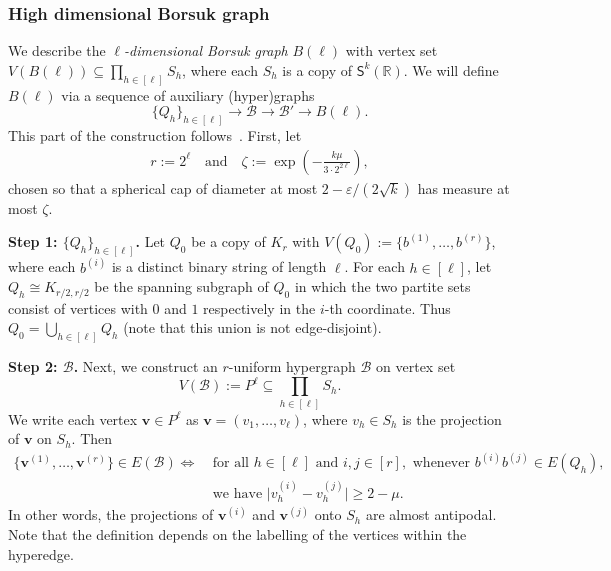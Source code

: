 \documentclass[11pt, a4paper]{article}
\newcommand{\V}[1]{\mathbold{#1}}
\theoremstyle{definition}
\def\eps{{\varepsilon}}
\newcommand{\cB}{\mathcal{B}}
\newcommand{\sS}{\mathsf{S}}
\newcommand{\sR}{\mathbb{R}}
\newcommand*{\bigabs}[1]{\bigl|#1\bigr|}
\begin{document}
\subsubsection{High dimensional Borsuk graph}\label{sec-hdB}
We describe the \emph{$\ell$-dimensional Borsuk graph} $B(\ell)$ with vertex set $V(B(\ell))\subseteq \prod_{h\in[\ell]}S_h$,
where each $S_h$ is a copy of $\sS^k(\sR)$. 
We will define $B(\ell)$ via a sequence of auxiliary (hyper)graphs 
$$\{Q_h\}_{h\in[\ell]}\longrightarrow \cB \longrightarrow \cB'\longrightarrow B(\ell).$$	
This part of the construction follows~\cite{BL-2}.
First, let
\begin{align}
r := 2^\ell\quad\text{and}\quad\zeta:=\exp\left(-\frac{k\mu}{3\cdot2^{2\ell}}\right),
\end{align} 
chosen so that a spherical cap of diameter at most $2-\eps/(2\sqrt{k})$ has measure at most $\zeta$.

\medskip
\noindent
\textbf{Step 1: $\{Q_h\}_{h \in [\ell]}$.}
Let $Q_0$ be a copy of $K_{r}$ with $V(Q_0):=\lbrace b^{(1)},\ldots,b^{(r)}\rbrace$, where each $b^{(i)}$ is a distinct binary string of length $\ell$. 
For each $h \in [\ell]$, let $Q_h\cong K_{r/2,r/2}$ be the spanning subgraph of $Q_0$ in which the two partite sets consist of vertices with $0$ and $1$ respectively in the $i$-th coordinate. %
Thus $Q_0=\bigcup_{h\in [\ell]}Q_h$ (note that this union is not edge-disjoint). 

\medskip
\noindent
\textbf{Step 2: $\cB$.}	
Next, we construct an $r$-uniform hypergraph $\cB$ on vertex set
$$
V(\cB) := P^\ell\subseteq  \prod_{h\in[\ell]}S_h.
$$
We write each vertex $\V{v}\in P^{\ell}$ as $\V{v} = (v_1,\ldots,v_\ell)$, where $v_h \in S_h$ is the projection of $\V{v}$ on $S_h$. Then  %
\begin{align}
\{\V{v}^{(1)},\ldots,\V{v}^{(r)}\} \in E(\cB) \iff~ &\text{for all }h\in [\ell] \text{ and }i,j\in [r], \text{ whenever }b^{(i)}b^{(j)}\in E(Q_h), \nonumber\\
&\text{we have }\bigabs{v^{(i)}_h - v^{(j)}_h}\ge 2-\mu. \label{def:cB}
\end{align}
In other words, the projections of $\V{v}^{(i)}$ and $\V{v}^{(j)}$ onto $S_h$ are almost antipodal. 
Note that the definition depends on the labelling of the vertices within the hyperedge.
\end{document}
